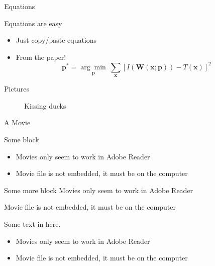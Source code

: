 \documentclass[xcolor=svgnames,handout]{beamer}
\begin{document}
\begin{frame}
  {Equations}

  Equations are easy
  \begin{itemize}
  \item Just copy/paste equations\pause
  \item From the paper!
    \begin{equation*}
      \textbf{p}^* = \underset{\textbf{p}}{\arg\!\min}~\sum_{\textbf{x}}\left[ I(\textbf{W}(\textbf{x};\textbf{p})) - T(\textbf{x}) \right]^2
    \end{equation*}
  \end{itemize}
\end{frame}


\begin{frame}
  {Pictures}

  \begin{figure}[t]
    \centering
    \caption{Kissing ducks}
  \end{figure}
\end{frame}


\begin{frame}
  {A Movie}

  \begin{block}{Some block}
    \begin{itemize}
    \item Movies only seem to work in Adobe Reader
    \item Movie file is not embedded, it must be on the computer
    \end{itemize}
  \end{block}

  \begin{exampleblock}{Some more block}
    Movies only seem to work in Adobe Reader\par
    Movie file is not embedded, it must be on the computer
  \end{exampleblock}

  \begin{alertblock}{}
    Some text in here.
    \begin{itemize}
    \item Movies only seem to work in Adobe Reader
    \item Movie file is not embedded, it must be on the computer
    \end{itemize}
  \end{alertblock}
\end{frame}
\end{document}
